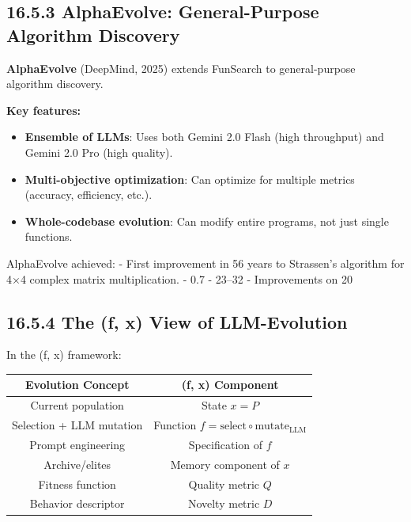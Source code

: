 \subsection{16.5.3 AlphaEvolve: General-Purpose Algorithm Discovery}

\textbf{AlphaEvolve} (DeepMind, 2025) extends FunSearch to general-purpose algorithm discovery.

\textbf{Key features:}
\begin{itemize}
\item \textbf{Ensemble of LLMs}: Uses both Gemini 2.0 Flash (high throughput) and Gemini 2.0 Pro (high quality).
\item \textbf{Multi-objective optimization}: Can optimize for multiple metrics (accuracy, efficiency, etc.).
\item \textbf{Whole-codebase evolution}: Can modify entire programs, not just single functions.
\end{itemize}

\begin{theorem}
AlphaEvolve achieved:
- First improvement in 56 years to Strassen's algorithm for 4×4 complex matrix multiplication.
- 0.7%
- 23--32%
- Improvements on 20%
\end{theorem}

\subsection{16.5.4 The (f, x) View of LLM-Evolution}

In the (f, x) framework:

\begin{center}
\begin{tabular}{cc}
\toprule
Evolution Concept & (f, x) Component \\
\midrule
Current population & State $x = P$ \\
Selection + LLM mutation & Function $f = \mathrm{select} \circ \mathrm{mutate}_{\mathrm{LLM}}$ \\
Prompt engineering & Specification of $f$ \\
Archive/elites & Memory component of $x$ \\
Fitness function & Quality metric $Q$ \\
Behavior descriptor & Novelty metric $D$ \\
\bottomrule
\end{tabular}
\end{center}

